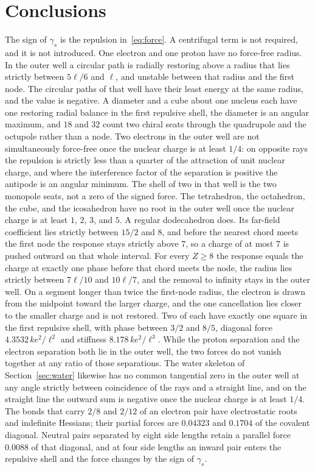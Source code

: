 \documentclass[a4paper]{article}
\begin{document}
\section{Conclusions}

The sign of \(\gamma_s\) is the repulsion in~\eqref{eq:force}. A centrifugal term is not required, and it is not introduced. One electron and one proton have no force-free radius. In the outer well a circular path is radially restoring above a radius that lies strictly between \(5\ell/6\) and \(\ell\), and unstable between that radius and the first node. The circular paths of that well have their least energy at the same radius, and the value is negative. A diameter and a cube about one nucleus each have one restoring radial balance in the first repulsive shell, the diameter is an angular maximum, and \(18\) and \(32\) count two chiral seats through the quadrupole and the octupole rather than a node. Two electrons in the outer well are not simultaneously force-free once the nuclear charge is at least \(1/4\): on opposite rays the repulsion is strictly less than a quarter of the attraction of unit nuclear charge, and where the interference factor of the separation is positive the antipode is an angular minimum. The shell of two in that well is the two monopole seats, not a zero of the signed force. The tetrahedron, the octahedron, the cube, and the icosahedron have no root in the outer well once the nuclear charge is at least \(1\), \(2\), \(3\), and \(5\). A regular dodecahedron does. Its far-field coefficient lies strictly between \(15/2\) and \(8\), and before the nearest chord meets the first node the response stays strictly above \(7\), so a charge of at most \(7\) is pushed outward on that whole interval. For every \(Z\ge 8\) the response equals the charge at exactly one phase before that chord meets the node, the radius lies strictly between \(7\ell/10\) and \(10\ell/7\), and the removal to infinity stays in the outer well. On a segment longer than twice the first-node radius, the electron is drawn from the midpoint toward the larger charge, and the one cancellation lies closer to the smaller charge and is not restored. Two of each have exactly one square in the first repulsive shell, with phase between \(3/2\) and \(8/5\), diagonal force \(4.3532\,k e^{2}/\ell^{2}\) and stiffness \(8.178\,k e^{2}/\ell^{3}\). While the proton separation and the electron separation both lie in the outer well, the two forces do not vanish together at any ratio of those separations. The water skeleton of Section~\ref{sec:water} likewise has no common tangential zero in the outer well at any angle strictly between coincidence of the rays and a straight line, and on the straight line the outward sum is negative once the nuclear charge is at least \(1/4\). The bonds that carry \(2/8\) and \(2/12\) of an electron pair have electrostatic roots and indefinite Hessians; their partial forces are \(0.04323\) and \(0.1704\) of the covalent diagonal. Neutral pairs separated by eight side lengths retain a parallel force \(0.0088\) of that diagonal, and at four side lengths an inward pair enters the repulsive shell and the force changes by the sign of \(\gamma_s\).
\end{document}
